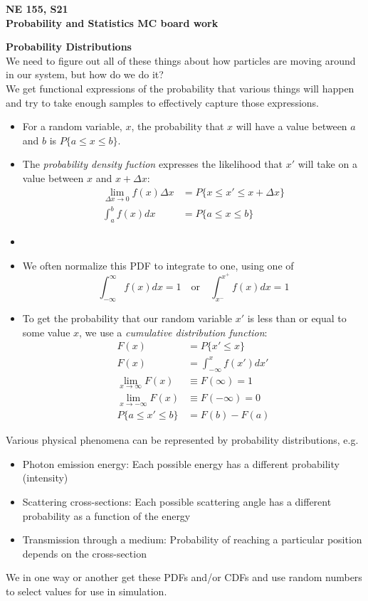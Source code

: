 \documentclass[12pt, answers]{exam}
\begin{document}
\begin{center}
{\bf NE 155, S21\\
Probability and Statistics MC board work
}
\end{center}


\noindent\textbf{Probability Distributions}\\
We need to figure out all of these things about how particles are moving around in our system, but how do we do it?\\
We get functional expressions of the probability that various things will happen and try to take enough samples to effectively capture those expressions.
%
\begin{itemize}
\item For a random variable, $x$, the probability that $x$ will have a value between $a$ and $b$ is $P\{a \leq x \leq b\}$.
%
\ifprintanswers
\item The \textit{probability density fuction} expresses the likelihood that $x'$ will take on a value between $x$ and $x+\Delta x$:
\begin{align*}
\lim_{\Delta x \to 0} f(x)\Delta x &= P \{ x \leq x' \leq x + \Delta x \}\\
\int_a^b f(x) dx &= P\{a \leq x \leq b\}
\end{align*}
\else
\item \vspace*{4em}
\fi
%
\item We often normalize this PDF to integrate to one, using one of
\begin{equation}
\int_{-\infty}^{\infty} f(x) dx = 1 \quad \text{or} \quad
\int_{x^-}^{x^+} f(x) dx = 1 \nonumber
\end{equation}
%
\item To get the probability that our random variable $x'$ is less than or equal to some value $x$, we use a \textit{cumulative distribution function}:
\begin{align*}
F(x) &= P\{x' \leq x\} \\
F(x) &= \int_{-\infty}^{x} f(x') dx' \\
\lim_{x \to \infty} F(x) &\equiv F(\infty) = 1 \\
\lim_{x \to -\infty} F(x) &\equiv F(-\infty) = 0 \\
P \{ a \leq x' \leq b \} &= F(b) - F(a)
\end{align*}
\end{itemize}

Various physical phenomena can be represented by probability distributions, e.g.
\begin{itemize}
  \item Photon emission energy: Each possible energy has a different probability (intensity)
  \item Scattering cross-sections: Each possible scattering angle has a different probability as a function of the energy
  \item Transmission through a medium: Probability of reaching a particular position
depends on the cross-section
\end{itemize}
%
We in one way or another get these PDFs and/or CDFs and use random numbers to select values for use in simulation.
\end{document}
